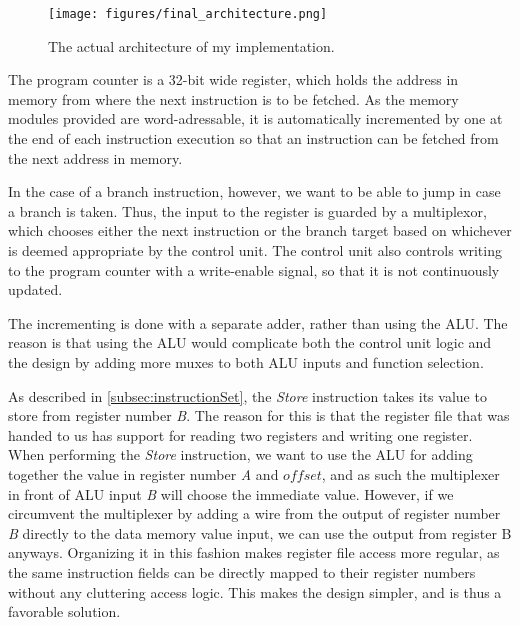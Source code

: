 \documentclass[11pt]{article}
\begin{document}
\begin{figure}[ht]
  \centering
  \texttt{[image: figures/final\_architecture.png]}
  \caption{\label{fig:myProcessorArchitecture} The actual architecture of my implementation.}
\end{figure}


The program counter is a 32-bit wide register, which holds the address
in memory from where the next instruction is to be fetched. As the
memory modules provided are word-adressable, it is automatically
incremented by one at the end of each instruction execution so that an
instruction can be fetched from the next address in memory. 

In the case of a branch instruction, however, we want to be able to
jump in case a branch is taken.  Thus, the input to the register is
guarded by a multiplexor, which chooses either the next instruction or
the branch target based on whichever is deemed appropriate by the
control unit. The control unit also controls writing to the program
counter with a write-enable signal, so that it is not continuously
updated.

The incrementing is done with a separate adder, rather than using the
ALU. The reason is that using the ALU would complicate both the
control unit logic and the design by adding more muxes to both ALU
inputs and function selection.

As described in \autoref{subsec:instructionSet}, the {\em Store}
instruction takes its value to store from register number {\em B}. The
reason for this is that the register file that was handed to us has
support for reading two registers and writing one register. When
performing the {\em Store} instruction, we want to use the ALU for
adding together the value in register number {\em A} and $offset$, and
as such the multiplexer in front of ALU input {\em B} will choose the
immediate value. However, if we circumvent the multiplexer by adding a
wire from the output of register number {\em B} directly to the data
memory value input, we can use the output from register B
anyways. Organizing it in this fashion makes register file access more
regular, as the same instruction fields can be directly mapped to
their register numbers without any cluttering access logic. This makes
the design simpler, and is thus a favorable solution.
\end{document}
